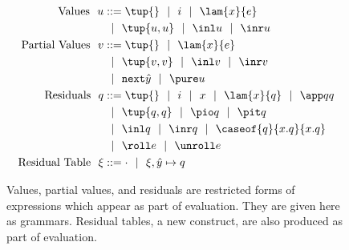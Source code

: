 
\begin{figure}
\begin{abstrsyn}
\[\begin{aligned}
\text{Values}\ \ 
u &::= \tup{}\gbar\inte
 \gbar \lam {\var}{e} \\
&\gbar \tup{u, u}
 \gbar \inl u 
 \gbar \inr u \\
\text{Partial Values}\ \ 
v &::= \tup{}
 \gbar \lam {\var}{\expr} \\
&\gbar \tup{v, v}
 \gbar \inl v 
 \gbar \inr v \\
&\gbar \next {\hat y}
 \gbar \pure u \\
\text{Residuals}\ \ 
q &::= \tup{}\gbar\inte\gbar\var%
 \gbar \lam {\var}{q} 
 \gbar \app q q \\
&\gbar \tup{q, q} 
 \gbar \pio q 
 \gbar \pit q \\
&\gbar \inl q 
 \gbar \inr q
 \gbar \caseof {q}{\var.q}{\var.q} \\
&\gbar \roll e
 \gbar \unroll e\\
\text{Residual Table}\ \ 
\xi &::= \cdot
 \gbar \xi, {\hat y} \mapsto q \\
\end{aligned}\]
\end{abstrsyn}
\caption{Values, partial values, and residuals are restricted forms of expressions
which appear as part of evaluation.
They are given here as grammars.  
Residual tables, a new construct, are also produced as part of evaluation.}
\end{figure}


